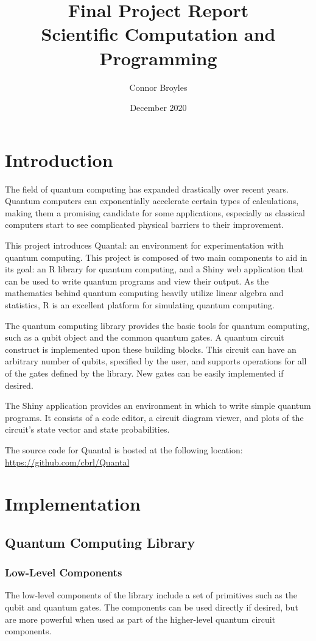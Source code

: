 \documentclass{article}
\title{Final Project Report \\ \large Scientific Computation and Programming}
\author{Connor Broyles}
\date{December 2020}
\begin{document}
\maketitle

\section{Introduction}
The field of quantum computing has expanded drastically over recent years. Quantum computers can exponentially accelerate certain types of calculations, making them a promising candidate for some applications, especially as classical computers start to see complicated physical barriers to their improvement.

This project introduces Quantal: an environment for experimentation with quantum computing. This project is composed of two main components to aid in its goal: an R library for quantum computing, and a Shiny web application that can be used to write quantum programs and view their output. As the mathematics behind quantum computing heavily utilize linear algebra and statistics, R is an excellent platform for simulating quantum computing.

The quantum computing library provides the basic tools for quantum computing, such as a qubit object and the common quantum gates. A quantum circuit construct is implemented upon these building blocks. This circuit can have an arbitrary number of qubits, specified by the user, and supports operations for all of the gates defined by the library. New gates can be easily implemented if desired.

The Shiny application provides an environment in which to write simple quantum programs. It consists of a code editor, a circuit diagram viewer, and plots of the circuit's state vector and state probabilities.

The source code for Quantal is hosted at the following location: \url{https://github.com/cbrl/Quantal}


\section{Implementation}
\subsection{Quantum Computing Library}
\subsubsection{Low-Level Components}
The low-level components of the library include a set of primitives such as the qubit and quantum gates. The components can be used directly if desired, but are more powerful when used as part of the higher-level quantum circuit components.
\end{document}
